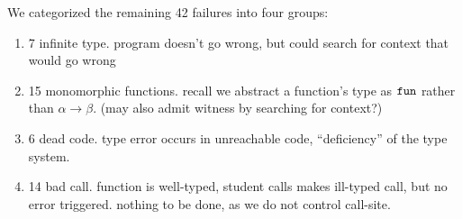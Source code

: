 We categorized the remaining 42 failures into four groups:
%
\begin{enumerate}
\item 7 infinite type. program doesn't go wrong, but could search for
  context that would go wrong
\item 15 monomorphic functions. recall we abstract a function's type as
  $\mathtt{fun}$ rather than $\alpha \to \beta$. (may also admit witness by
  searching for context?)
\item 6 dead code. type error occurs in unreachable code, ``deficiency''
  of the type system.
\item 14 bad call. function is well-typed, student calls makes ill-typed
  call, but no error triggered. nothing to be done, as we do not control
  call-site.
\end{enumerate}
